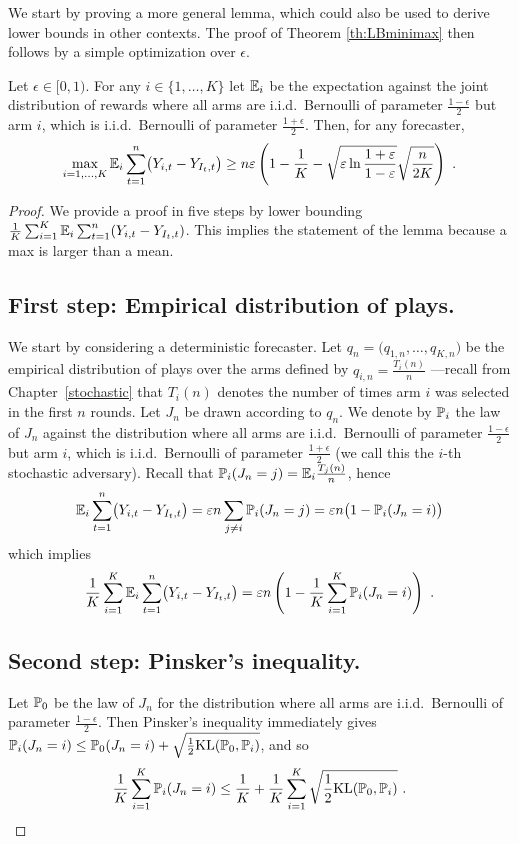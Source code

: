 We start by proving a more general lemma, which could also be used to derive lower bounds in other contexts. The proof of Theorem \ref{th:LBminimax} then follows by a simple optimization over $\epsilon$.
%
\begin{lemma} \label{lem:LBminimax}
Let $\epsilon \in [0,1)$. For any $i \in \{1,\hdots, K\}$ let $\E_i$ be the expectation against the joint distribution of rewards where all arms are i.i.d.\ Bernoulli of parameter $\frac{1-\epsilon}{2}$ but arm $i$, which is i.i.d.\ Bernoulli of parameter $\frac{1+\epsilon}{2}$. Then, for any forecaster,
$$\max_{i = 1, \hdots, K}  \E_i \sum_{t=1}^n \bigl(Y_{i,t} - Y_{I_t,t}\bigr) \geq n \epsilon \left(1 - \frac{1}{K} - \sqrt{\epsilon \ln\frac{1+\epsilon}{1-\epsilon}}  \sqrt{\frac{n}{2 K}}\right)~.$$
\end{lemma}
%
\begin{proof}
We provide a proof in five steps by lower bounding $\frac{1}{K} \sum_{i=1}^K \E_i \sum_{t=1}^n (Y_{i,t} - Y_{I_t,t})$. This implies the statement of the lemma because a max is larger than a mean.
%
\subsection*{First step: Empirical distribution of plays.}
%
We start by considering a deterministic forecaster. Let $q_n=\bigl(q_{1,n},\hdots,q_{K,n}\bigr)$ be the empirical distribution of plays over the arms defined by $q_{i,n} = \frac{T_i(n)}{n}$ ---recall from Chapter~\ref{stochastic} that $T_i(n)$ denotes the number of times arm $i$ was selected in the first $n$ rounds. Let $J_n$ be drawn according to $q_n$. We denote by $\P_i$ the law of $J_n$ against the distribution where all arms are i.i.d.\ Bernoulli of parameter $\frac{1-\epsilon}{2}$ but arm $i$, which is i.i.d.\ Bernoulli of parameter $\frac{1+\epsilon}{2}$ (we call this the $i$-th stochastic adversary). Recall that $\P_{i}(J_n = j) = \E_i\tfrac{T_j(n)}{n}$, hence
$$\E_i \sum_{t=1}^n \bigl(Y_{i,t} - Y_{I_t,t}\bigr) = \epsilon n \sum_{j \neq i} \P_{i}(J_n = j) = \epsilon n \bigl(1 - \P_{i}(J_n = i)\bigr)$$
which implies
\begin{equation} \label{eq:firststepmm}
\frac{1}{K} \sum_{i=1}^K \E_i \sum_{t=1}^n \bigl(Y_{i,t} - Y_{I_t,t}\bigr) = \epsilon n \left(1 - \frac{1}{K} \sum_{i=1}^K \P_{i}(J_n = i)\right)~.
\end{equation}

\subsection*{Second step: Pinsker's inequality.}
%
Let $\P_0$ be the law of $J_n$ for the distribution where all arms are i.i.d.\ Bernoulli of parameter $\frac{1-\epsilon}{2}$. Then Pinsker's inequality immediately gives $\P_{i}(J_n = i) \le \P_{0}(J_n = i) + \sqrt{\tfrac{1}{2} \K(\P_{0},\P_{i})}$, and so
\begin{equation} \label{eq:secondstepmm}
\frac{1}{K} \sum_{i=1}^K \P_{i}(J_n = i) \leq \frac{1}{K} +  \frac{1}{K} \sum_{i=1}^K \sqrt{\frac{1}{2} \K(\P_{0}, \P_{i})}~.
\end{equation}


\end{proof}
